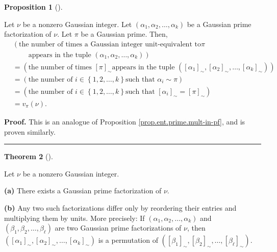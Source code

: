 \documentclass[numbers=enddot,12pt,final,onecolumn,notitlepage]{scrartcl}%
\numberwithin{exer}{subsection}
\theoremstyle{definition}
\newtheorem{theo}{Theorem}[subsection]
\newenvironment{theorem}[1][]
{\begin{theo}[#1]\begin{leftbar}}
{\end{leftbar}\end{theo}}
\newtheorem{prop}[theo]{Proposition}
\newenvironment{proposition}[1][]
{\begin{prop}[#1]\begin{leftbar}}
{\end{leftbar}\end{prop}}
\newenvironment{proof}[1][Proof]{\noindent\textbf{#1.} }{\ \rule{0.5em}{0.5em}}
\begin{document}
\begin{proposition}
\label{prop.Z[i].prime.mult-in-pf}Let $\nu$ be a nonzero Gaussian integer. Let
$\left(  \alpha_{1},\alpha_{2},\ldots,\alpha_{k}\right)  $ be a Gaussian prime
factorization of $\nu$. Let $\pi$ be a Gaussian prime. Then,%
\begin{align*}
&  \left(  \text{the number of times a Gaussian integer unit-equivalent to
}\pi\right. \\
&  \ \ \ \ \ \ \ \ \ \ \left.  \text{appears in the tuple }\left(  \alpha
_{1},\alpha_{2},\ldots,\alpha_{k}\right)  \right) \\
&  =\left(  \text{the number of times }\left[  \pi\right]  _{\sim}\text{
appears in the tuple }\left(  \left[  \alpha_{1}\right]  _{\sim},\left[
\alpha_{2}\right]  _{\sim},\ldots,\left[  \alpha_{k}\right]  _{\sim}\right)
\right) \\
&  =\left(  \text{the number of }i\in\left\{  1,2,\ldots,k\right\}  \text{
such that }\alpha_{i}\sim\pi\right) \\
&  =\left(  \text{the number of }i\in\left\{  1,2,\ldots,k\right\}  \text{
such that }\left[  \alpha_{i}\right]  _{\sim}=\left[  \pi\right]  _{\sim
}\right) \\
&  =v_{\pi}\left(  \nu\right)  .
\end{align*}

\end{proposition}

\begin{proof}
This is an analogue of Proposition \ref{prop.ent.prime.mult-in-pf}, and is
proven similarly.
\end{proof}

\begin{theorem}
\label{thm.Z[i].prime.fac-uni}Let $\nu$ be a nonzero Gaussian integer.

\textbf{(a)} There exists a Gaussian prime factorization of $\nu$.

\textbf{(b)} Any two such factorizations differ only by reordering their
entries and multiplying them by units. More precisely: If $\left(  \alpha
_{1},\alpha_{2},\ldots,\alpha_{k}\right)  $ and $\left(  \beta_{1},\beta
_{2},\ldots,\beta_{\ell}\right)  $ are two Gaussian prime factorizations of
$\nu$, then $\left(  \left[  \alpha_{1}\right]  _{\sim},\left[  \alpha
_{2}\right]  _{\sim},\ldots,\left[  \alpha_{k}\right]  _{\sim}\right)  $ is a
permutation of $\left(  \left[  \beta_{1}\right]  _{\sim},\left[  \beta
_{2}\right]  _{\sim},\ldots,\left[  \beta_{\ell}\right]  _{\sim}\right)  $.
\end{theorem}
\end{document}
